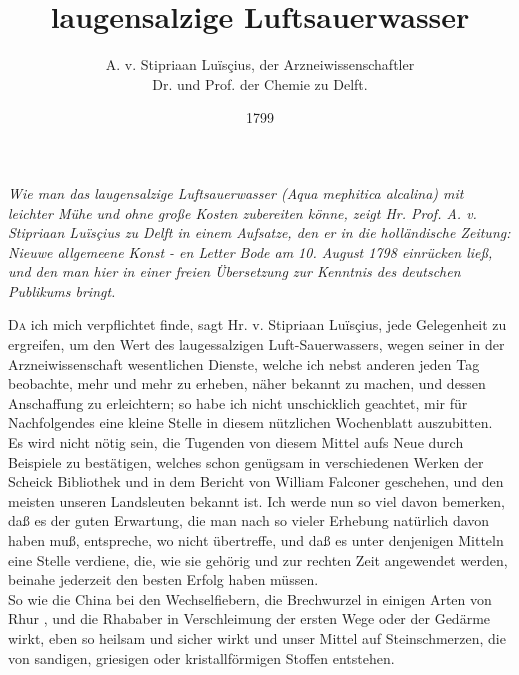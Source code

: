 \documentclass[11pt,a5paper,twoside]{memoir}
\title{laugensalzige Luftsauerwasser}
\author{A. v. Stipriaan Luïsçius, der Arzneiwissenschaftler\\Dr. und Prof. der Chemie zu Delft.}
\date{1799}
\newcommand{\HorRule}[1]{\noindent\rule{\linewidth}{#1}} %
\newcommand{\headruler}[1]{\begin{minipage}{#1}
  \HorRule{2pt} \\[-0.85\baselineskip]
  \HorRule{.7pt}
\end{minipage}}%
\begin{document}

\maketitle

\newpage
\mbox{}
\newpage

\setcounter{page}{3}
\fancyhead[C]{\headruler{\textwidth}}

\null
\vfill

\noindent
\emph{Wie man das laugensalzige Luftsauerwasser
({\lattext Aqua mephitica alcalina})
mit leichter Mühe und ohne große Kosten zubereiten könne,
zeigt Hr. Prof. A. v. Stipriaan Luïsçius zu Delft
in einem Aufsatze, den er in die holländische Zeitung:
{\lattext Nieuwe allgemeene Konst - en Letter Bode}
am 10. August 1798 einrücken ließ,
und den man hier in einer freien Übersetzung
zur Kenntnis des deutschen Publikums bringt.}\\

\vspace{5em}

\lettrine{D}a ich mich verpflichtet finde,
sagt Hr. v. Stipriaan Luïsçius, jede Gelegenheit zu ergreifen,
um den Wert des laugessalzigen Luft-Sauerwassers,
wegen seiner in der Arzneiwissenschaft wesentlichen Dienste,
welche ich nebst anderen jeden Tag beobachte,
mehr und mehr zu erheben, näher bekannt zu machen,
und dessen Anschaffung zu erleichtern;
so habe ich nicht unschicklich geachtet,
mir für Nachfolgendes eine kleine Stelle
in diesem nützlichen Wochenblatt auszubitten.\\

Es wird nicht nötig sein,
die Tugenden von diesem Mittel aufs Neue durch Beispiele zu bestätigen,
welches schon genügsam in verschiedenen Werken der Scheick Bibliothek%
und in dem Bericht von William Falconer%
geschehen, und den meisten unseren Landsleuten bekannt ist.
Ich werde nun so viel davon bemerken, daß es der guten Erwartung,
die man nach so vieler Erhebung natürlich davon haben muß,
entspreche, wo nicht übertreffe,
und daß es unter denjenigen Mitteln eine Stelle verdiene,
die, wie sie gehörig und zur rechten Zeit angewendet werden,
beinahe jederzeit den besten Erfolg haben müssen.\\

So wie die China%
 bei den Wechselfiebern,
die Brechwurzel in einigen Arten von Rhur%
,
und die Rhababer in Verschleimung der ersten Wege oder der Gedärme wirkt,
eben so heilsam und sicher wirkt und unser Mittel auf Steinschmerzen,
die von sandigen, griesigen oder kristallförmigen Stoffen%
entstehen.\\
\end{document}
